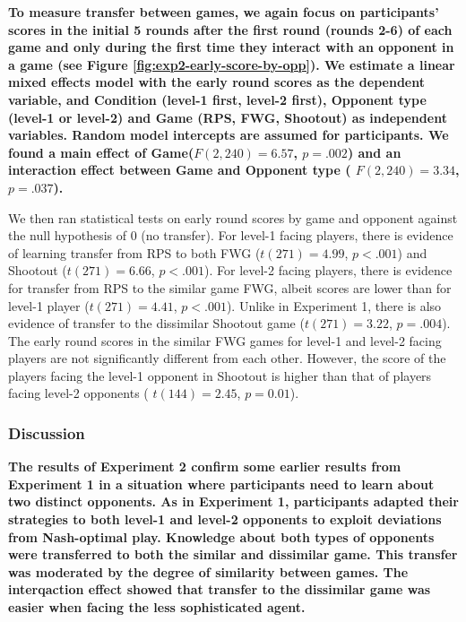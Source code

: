 \documentclass[man,floatsintext]{apa6}
\begin{document}
\textbf{To measure transfer between games, we again focus on participants' scores in the initial 5 rounds after the first round (rounds 2-6) of each game and only during the first time they interact with an opponent in a game (see Figure \ref{fig:exp2-early-score-by-opp}). We estimate a linear mixed effects model with the early round scores as the dependent variable, and Condition (level-1 first, level-2 first), Opponent type (level-1 or level-2) and Game (RPS, FWG, Shootout) as independent variables. Random model intercepts are assumed for participants. We found a main effect of Game(\(F(2,240) = 6.57\), \(p = .002\)) and an interaction effect between Game and Opponent type ( \(F(2,240) = 3.34\), \(p = .037\)).}

We then ran statistical tests on early round scores by game and opponent against the null hypothesis of 0 (no transfer). For level-1 facing players, there is evidence of learning transfer from RPS to both FWG (\(t(271) = 4.99\), \(p < .001\)) and Shootout (\(t(271) = 6.66\), \(p < .001\)). For level-2 facing players, there is evidence for transfer from RPS to the similar game FWG, albeit scores are lower than for level-1 player (\(t(271) = 4.41\), \(p < .001\)). Unlike in Experiment 1, there is also evidence of transfer to the dissimilar Shootout game (\(t(271) = 3.22\), \(p = .004\)). The early round scores in the similar FWG games for level-1 and level-2 facing players are not significantly different from each other. However, the score of the players facing the level-1 opponent in Shootout is higher than that of players facing level-2 opponents ( \(t(144) = 2.45\), \(p = 0.01\)).

\hypertarget{discussion-1}{%
\subsubsection{Discussion}\label{discussion-1}}

\textbf{The results of Experiment 2 confirm some earlier results from Experiment 1 in a situation where participants need to learn about two distinct opponents. As in Experiment 1, participants adapted their strategies to both level-1 and level-2 opponents to exploit deviations from Nash-optimal play. Knowledge about both types of opponents were transferred to both the similar and dissimilar game. This transfer was moderated by the degree of similarity between games. The interqaction effect showed that transfer to the dissimilar game was easier when facing the less sophisticated agent. }
\end{document}
